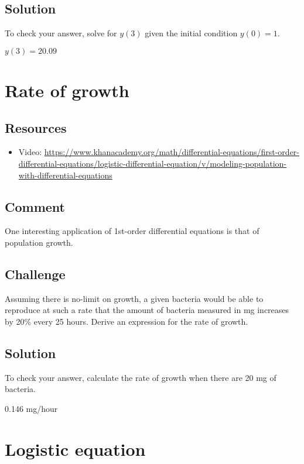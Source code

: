 \subsection*{Solution}
To check your answer, solve for $y(3)$ given the initial condition $y(0) = 1$.

$y(3) = 20.09$




\newpage
\section{Rate of growth}

\subsection*{Resources}
\begin{itemize}
    \item Video: \url{https://www.khanacademy.org/math/differential-equations/first-order-differential-equations/logistic-differential-equation/v/modeling-population-with-differential-equations}
\end{itemize}

\subsection*{Comment}
One interesting application of 1st-order differential equations is that of population growth.

\subsection*{Challenge}
Assuming there is no-limit on growth, a given bacteria would be able to reproduce at such a rate that the amount of bacteria measured in mg increases by 20\% every 25 hours. Derive an expression for the rate of growth.

\subsection*{Solution}
To check your answer, calculate the rate of growth when there are 20 mg of bacteria.

0.146 mg/hour




\newpage
\section{Logistic equation}


